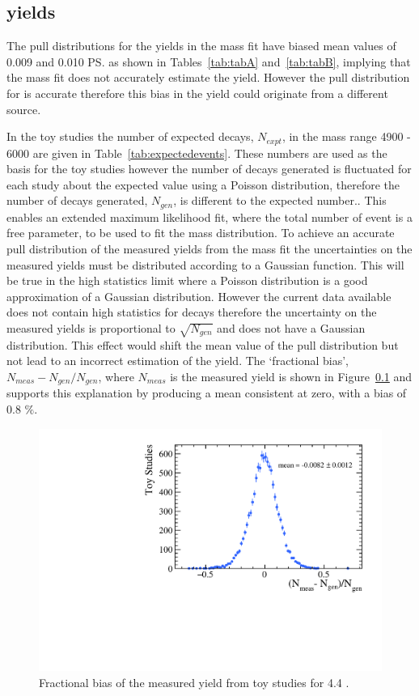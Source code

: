 \subsection{\bsmumu yields}
The pull distributions for the \bsmumu yields in the mass fit have biased mean values of 0.009 and 0.010 \ps as shown in Tables~\ref{tab:tabA} and~\ref{tab:tabB}, implying that the mass fit does not accurately estimate the \bsmumu yield. However the pull distribution for \Gmumu is accurate therefore this bias in the \bsmumu yield could originate from a different source.

In the toy studies the number of expected decays, $N_{expt}$, in the mass range 4900 - 6000 \mevcc are given in Table~\ref{tab:expectedevents}. These numbers are used as the basis for the toy studies however the number of decays generated is fluctuated for each study about the expected value using a Poisson distribution, therefore the number of decays generated, $N_{gen}$, is different to the expected number.. This enables an extended maximum likelihood fit, where the total number of event is a free parameter, to be used to fit the mass distribution. To achieve an accurate pull distribution of the measured \bsmumu yields from the mass fit the uncertainties on the measured yields must be distributed according to a Gaussian function. This will be true in the high statistics limit where a Poisson distribution is a good approximation of a Gaussian distribution. However the current data available does not contain high statistics for \bsmumu decays therefore the uncertainty on the measured yields is proportional to $\sqrt{N_{gen}}$ and does not have a Gaussian distribution. This effect would shift the mean value of the pull distribution but not lead to an incorrect estimation of the \bsmumu yield. The `fractional bias', $N_{meas} - N_{gen}/N_{gen}$, where $N_{meas}$ is the measured \bsmumu yield is shown in Figure~\ref{} and supports this explanation by producing a mean consistent at zero, with a bias of 0.8 $\%$. 

\begin{figure}[htbp]
    \centering
        \includegraphics[width=0.6 \textwidth]{./Figs/LifetimeSystematics/Bs2MuMu_yield_fraction_bias_CKM16.pdf}
    \caption{Fractional bias of the measured \bsmumu yield from toy studies for 4.4 \fb.}
    \label{fig:FracBias}
\end{figure}


